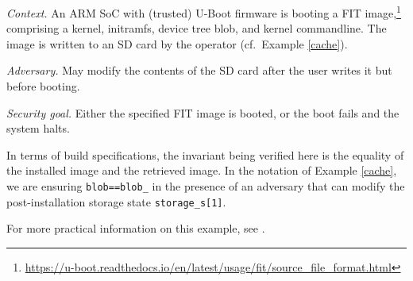 \begin{example}

  \emph{Context.} An ARM SoC with (trusted) U-Boot firmware is booting a FIT
  image,\footnote{\url{https://u-boot.readthedocs.io/en/latest/usage/fit/source_file_format.html}} comprising a kernel, initramfs, device tree blob, and kernel commandline.
  The image is written to an SD card by the operator (cf.~Example \ref{cache}).

  \emph{Adversary.} May modify the contents of the SD card after the user writes it but before booting.

  \emph{Security goal.} Either the specified FIT image is booted, or the boot fails and the system halts.


  In terms of build specifications, the invariant being verified here is the equality of the installed image and the retrieved image.
  In the notation of Example \ref{cache}, we are ensuring \texttt{blob==blob\_} in the presence of an adversary that can modify the post-installation storage state \texttt{storage\_s[1]}.

  For more practical information on this example, see \cite{timesys2023securing}.

\end{example}


